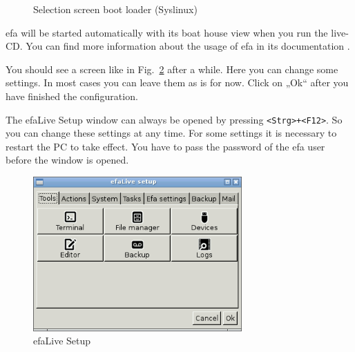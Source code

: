 \documentclass[a4paper,12pt,twoside]{article}
\begin{document}
\begin{figure}
    \centering
    \caption{Selection screen boot loader (Syslinux)}
    \label{fig:syslinux}
\end{figure}

efa will be started automatically with its boat house view when you run
the live-CD. You can find more information about the usage of efa in
its documentation \cite{EFA2}.

You should see a screen like in Fig.~\ref{fig:efalivesetup_live} after a while.
Here you can change some settings. In most cases you can leave them as is for now. 
Click on „Ok“ after you have finished the configuration.

The efaLive Setup window can always be opened by pressing
\texttt{{\textless}Strg{\textgreater}+{\textless}F12{\textgreater}}. So you can
change these settings at any time. For some settings it is necessary to
restart the PC to take effect. You have to pass the password of the efa
user before the window is opened.

\begin{figure}
    \centering
    \includegraphics[width=8cm]{screenshots/efalive_setup.png}
    \caption{efaLive Setup}
    \label{fig:efalivesetup_live}
\end{figure}
\end{document}

